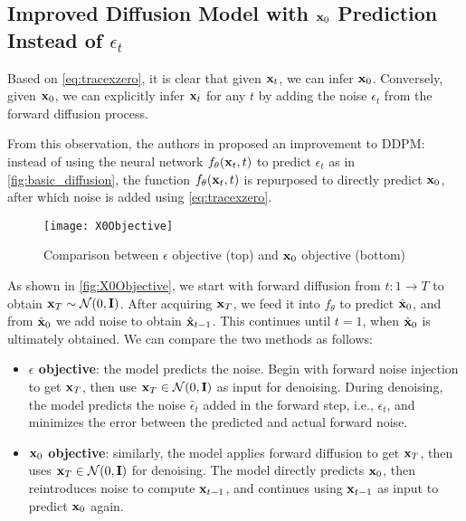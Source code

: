 \subsection{Improved Diffusion Model with $\mathbf{x}_0$ Prediction Instead of $\epsilon_t$}
\label{subsec:X0Objective}

Based on \autoref{eq:tracexzero}, it is clear that given $\mathbf{x}_t$, we can infer $\mathbf{x}_0$. Conversely, given $\mathbf{x}_0$, we can explicitly infer $\mathbf{x}_t$ for any $t$ by adding the noise $\epsilon_t$ from the forward diffusion process.

From this observation, the authors in \cite{nichol2021improved} proposed an improvement to DDPM: instead of using the neural network $f_{\theta}(\mathbf{x}_t, t)$ to predict $\epsilon_t$ as in \autoref{fig:basic_diffusion}, the function $f_{\theta}(\mathbf{x}_t, t)$ is repurposed to directly predict $\mathbf{x}_0$, after which noise is added using \autoref{eq:tracexzero}.

\begin{figure}[h]
	\captionsetup{skip=2pt}
	\texttt{[image: X0Objective]}
	\caption{Comparison between $\epsilon$ objective (top) and $\mathbf{x}_0$ objective (bottom)}
	\label{fig:X0Objective}
\end{figure}

As shown in \autoref{fig:X0Objective}, we start with forward diffusion from $t: 1 \rightarrow T$ to obtain $\mathbf{x}_T \sim \mathcal{N} (0, \mathbf{I})$. After acquiring $\mathbf{x}_T$, we feed it into $f_{\theta}$ to predict $\hat{\mathbf{x}}_0$, and from $\hat{\mathbf{x}}_0$ we add noise to obtain $\hat{\mathbf{x}}_{t-1}$. This continues until $t = 1$, when $\hat{\mathbf{x}}_0$ is ultimately obtained. We can compare the two methods as follows:

\begin{itemize}
	\item \textbf{$\epsilon$ objective}: the model predicts the noise. Begin with forward noise injection to get $\mathbf{x}_T$, then use $\mathbf{x}_T \in \mathcal{N}(0, \mathbf{I})$ as input for denoising. During denoising, the model predicts the noise $\hat{\epsilon}_t$ added in the forward step, i.e., $\epsilon_t$, and minimizes the error between the predicted and actual forward noise.
	\item \textbf{$\mathbf{x}_0$ objective}: similarly, the model applies forward diffusion to get $\mathbf{x}_T$, then uses $\mathbf{x}_T \in \mathcal{N}(0, \mathbf{I})$ for denoising. The model directly predicts $\mathbf{x}_0$, then reintroduces noise to compute $\mathbf{x}_{t-1}$, and continues using $\mathbf{x}_{t-1}$ as input to predict $\mathbf{x}_0$ again.
\end{itemize}

